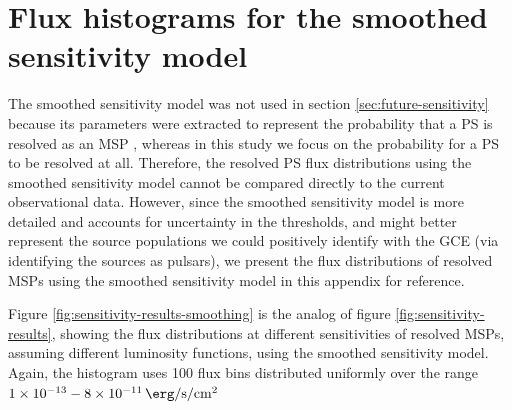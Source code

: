 \documentclass[letter,11pt]{article}
\begin{document}
\section{Flux histograms for the smoothed sensitivity model}
\label{app:smooth-hists}

The smoothed sensitivity model was not used in section \ref{sec:future-sensitivity} because its parameters were extracted to represent the probability that a PS is resolved as an MSP \cite{Ploeg:2020jeh, Gautam:2021wqn}, whereas in this study we focus on the probability for a PS to be resolved at all. Therefore, the resolved PS flux distributions using the smoothed sensitivity model cannot be compared directly to the current observational data. However, since the smoothed sensitivity model is more detailed and accounts for uncertainty in the thresholds, and might better represent the source populations we could positively identify with the GCE (via identifying the sources as pulsars), we present the flux distributions of resolved MSPs using the smoothed sensitivity model in this appendix for reference.

Figure \ref{fig:sensitivity-results-smoothing} is the analog of figure \ref{fig:sensitivity-results}, showing the flux distributions at different sensitivities of resolved MSPs, assuming different luminosity functions, using the smoothed sensitivity model. Again, the histogram uses 100 flux bins distributed uniformly over the range $\num{1e-13}-\SI{8e-11}{\erg\per\second\per\centi\meter\squared}$
\end{document}
